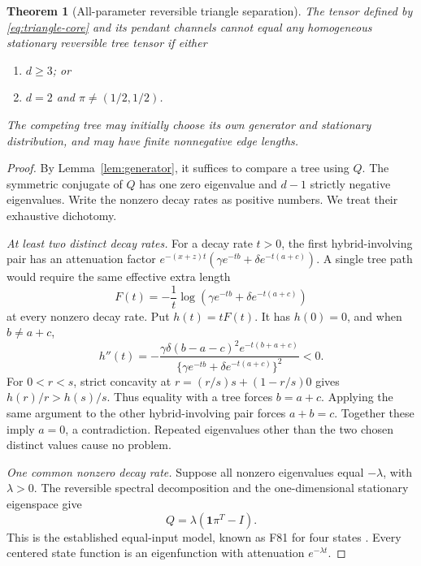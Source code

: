 \documentclass[11pt]{article}
\newtheorem{theorem}{Theorem}[section]
\theoremstyle{definition}
\theoremstyle{remark}
\newcommand{\one}{\mathbf 1}
\begin{document}
\begin{theorem}[All-parameter reversible triangle separation]
\label{thm:triangle}
The tensor defined by \eqref{eq:triangle-core} and its pendant channels
cannot equal any homogeneous stationary reversible tree tensor if either
\begin{enumerate}[label=(\roman*)]
\item $d\ge3$; or
\item $d=2$ and $\pi\ne(1/2,1/2)$.
\end{enumerate}
The competing tree may initially choose its own generator and stationary
distribution, and may have finite nonnegative edge lengths.
\end{theorem}
\begin{proof}
By Lemma~\ref{lem:generator}, it suffices to compare a tree using $Q$.
The symmetric conjugate of $Q$ has one zero eigenvalue and $d-1$ strictly
negative eigenvalues. Write the nonzero decay rates as positive numbers.
We treat their exhaustive dichotomy.

\emph{At least two distinct decay rates.}
For a decay rate $t>0$, the first hybrid-involving pair has an attenuation
factor $e^{-(x+z)t}(\gamma e^{-tb}+\delta e^{-t(a+c)})$.
A single tree path would require the same effective extra length
\begin{equation}\label{eq:effective-length}
 F(t)=-\frac1t\log(\gamma e^{-tb}+\delta e^{-t(a+c)})
\end{equation}
at every nonzero decay rate. Put $h(t)=tF(t)$. It has $h(0)=0$, and when
$b\ne a+c$,
\begin{equation}\label{eq:strict-concavity}
 h''(t)=-\frac{\gamma\delta(b-a-c)^2e^{-t(b+a+c)}}
 {\{\gamma e^{-tb}+\delta e^{-t(a+c)}\}^2}<0.
\end{equation}
For $0<r<s$, strict concavity at
$r=(r/s)s+(1-r/s)0$ gives $h(r)/r>h(s)/s$. Thus equality with a tree
forces $b=a+c$. Applying the same argument to the other hybrid-involving
pair forces $a+b=c$. Together these imply $a=0$, a contradiction.
Repeated eigenvalues other than the two chosen distinct values cause no
problem.

\emph{One common nonzero decay rate.}
Suppose all nonzero eigenvalues equal $-\lambda$, with $\lambda>0$.
The reversible spectral decomposition and the one-dimensional stationary
eigenspace give
\begin{equation}\label{eq:equal-input}
 Q=\lambda(\one\pi^T-I).
\end{equation}
This is the established equal-input model, known as F81 for four states
\cite{CasanellasSteel2017}. Every centered state function is an
eigenfunction with attenuation $e^{-\lambda t}$.


\end{proof}
\end{document}
